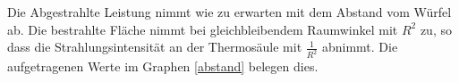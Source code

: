 Die Abgestrahlte Leistung nimmt wie zu erwarten mit dem Abstand vom Würfel ab. Die bestrahlte Fläche nimmt bei gleichbleibendem Raumwinkel mit $R^2$ zu, so dass die Strahlungsintensität an der Thermosäule mit $\frac{1}{R^2}$ abnimmt. Die aufgetragenen Werte im Graphen \eqref{abstand} belegen dies.







